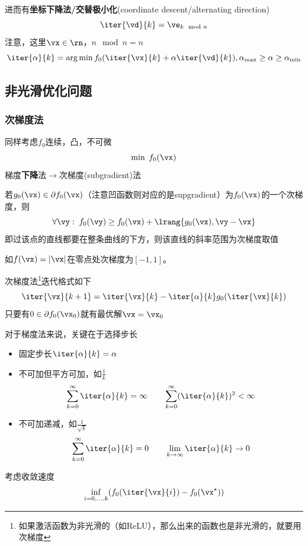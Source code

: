 进而有\textbf{坐标下降法/交替极小化}(coordinate descent/alternating direction)
\[\iter{\vd}{k}=\ve_{k \mod n}\]
注意，这里$\vx\in\rn$，$n \mod n = n$
\[\iter{\alpha}{k}=\arg\min f_0(\iter{\vx}{k}+\alpha\iter{\vd}{k}),\alpha_{\max}\geq \alpha\geq \alpha_{\min}\]


\subsection{非光滑优化问题}
\subsubsection{次梯度法}
同样考虑$f_0$连续，凸，不可微
\[\min\;f_0(\vx)\]
梯度\textbf{下降}法$\to$次梯度(subgradient)法
\begin{definition}[次梯度]
若$g_0(\vx)\in\partial f_0(\vx)$（注意凹函数则对应的是supgradient）为$f_0(\vx)$的一个次梯度，则
\[\forall \vy:\;f_0(\vy)\geq f_0(\vx)+\lrang{g_0(\vx),\vy-\vx}\]
即过该点的直线都要在整条曲线的下方，则该直线的斜率范围为次梯度取值
\end{definition}
如$f(\vx)=|\vx|$在零点处次梯度为$[-1,1]$。

次梯度法\footnote{如果激活函数为非光滑的（如ReLU），那么出来的函数也是非光滑的，就要用次梯度}迭代格式如下
\[\iter{\vx}{k+1}=\iter{\vx}{k}-\iter{\alpha}{k}g_0(\iter{\vx}{k})\]
只要有$0\in\partial f_0(\vx_0)$就有最优解$\vx=\vx_0$

对于梯度法来说，关键在于选择步长
\begin{itemize}
    \item 固定步长$\iter{\alpha}{k}=\alpha$
    \item 不可加但平方可加，如$\frac{1}{k}$
    \[\sum_{k=0}^\infty \iter{\alpha}{k}=\infty\qquad\sum_{k=0}^\infty(\iter{\alpha}{k})^2<\infty\]
    \item 不可加递减，如$\frac{1}{\sqrt{k}}$
    \[\sum_{k=0}^\infty\iter{\alpha}{k}=0\qquad\lim_{k\to\infty}\iter{\alpha}{k}\to 0\]
\end{itemize}

考虑收敛速度
\[\inf_{i=0,\ldots,k}(f_0(\iter{\vx}{i})-f_0(\vx^\star))\]

